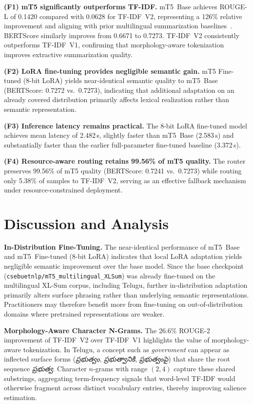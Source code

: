 \documentclass[runningheads]{llncs}
\begin{document}
\textbf{(F1) mT5 significantly outperforms TF-IDF.}
mT5~Base achieves ROUGE-L of 0.1420 compared with
0.0628 for TF-IDF~V2, representing a 126\% relative
improvement and aligning with prior multilingual
summarization baselines~\cite{hasan2021xlsum}.
BERTScore similarly improves from 0.6671 to 0.7273.
TF-IDF~V2 consistently outperforms TF-IDF~V1,
confirming that morphology-aware tokenization improves
extractive summarization quality.

\textbf{(F2) LoRA fine-tuning provides negligible semantic gain.}
mT5 Fine-tuned (8-bit LoRA) yields near-identical
semantic quality to mT5~Base (BERTScore: 0.7272 vs.\
0.7273), indicating that additional adaptation on an
already covered distribution primarily affects lexical
realization rather than semantic representation.

\textbf{(F3) Inference latency remains practical.}
The 8-bit LoRA fine-tuned model achieves mean latency
of 2.482\,s, slightly faster than mT5~Base (2.583\,s)
and substantially faster than the earlier full-parameter
fine-tuned baseline (3.372\,s).

\textbf{(F4) Resource-aware routing retains 99.56\% of mT5 quality.}
The router preserves 99.56\% of mT5 quality
(BERTScore: 0.7241 vs.\ 0.7273) while routing only
5.38\% of samples to TF-IDF~V2, serving as an effective
fallback mechanism under resource-constrained deployment.



\section{Discussion and Analysis}
\label{sec:analysis}

\textbf{In-Distribution Fine-Tuning.}
The near-identical performance of mT5~Base and mT5~Fine-tuned (8-bit LoRA) indicates that local LoRA adaptation yields negligible semantic improvement over the base model. Since the base checkpoint (\texttt{csebuetnlp/mT5\_multilingual\_XLSum}) was already fine-tuned on the multilingual XL-Sum corpus, including Telugu, further in-distribution adaptation primarily alters surface phrasing rather than underlying semantic representations. Practitioners may therefore benefit more from fine-tuning on out-of-distribution domains where pretrained representations are weaker.

\textbf{Morphology-Aware Character N-Grams.}
The 26.6\% ROUGE-2 improvement of TF-IDF~V2 over TF-IDF~V1 highlights the value of morphology-aware tokenization. In Telugu, a concept such as \textit{government} can appear as inflected surface forms (\textit{{\telugufont ప్రభుత్వం}}, \textit{{\telugufont ప్రభుత్వానికి}}, \textit{{\telugufont ప్రభుత్వంపై}}) that share the root sequence \textit{{\telugufont ప్రభుత్వ}}. Character $n$-grams with range $(2,4)$ capture these shared substrings, aggregating term-frequency signals that word-level TF-IDF would otherwise fragment across distinct vocabulary entries, thereby improving salience estimation.
\end{document}
